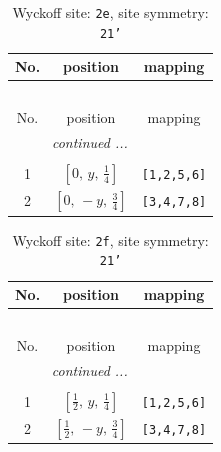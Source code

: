 \documentclass[fleqn,8pt]{jsarticle}
\begin{document}
\begin{longtable}{ccc}
\caption{Wyckoff site: {\tt 2e}, site symmetry: {\tt 21'}}
 \\
 \hline \hline
No. & position & mapping \\ \hline \endfirsthead

\multicolumn{2}{l}{\tablename\ \thetable{}} \\
 \hline \hline
No. & position & mapping \\ \hline \endhead

 \hline \hline
\multicolumn{2}{r}{\footnotesize\it continued ...} \\ \endfoot

 \hline \hline
\multicolumn{2}{r}{} \\ \endlastfoot

1 & $\left[ 0,\, y,\, \frac{1}{4} \right]$ & {\tt [1,2,5,6]} \\ \hline
2 & $\left[ 0,\, - y,\, \frac{3}{4} \right]$ & {\tt [3,4,7,8]} \\
\end{longtable}
\renewcommand{\arraystretch}{1.2}
\begin{longtable}{ccc}
\caption{Wyckoff site: {\tt 2f}, site symmetry: {\tt 21'}}
 \\
 \hline \hline
No. & position & mapping \\ \hline \endfirsthead

\multicolumn{2}{l}{\tablename\ \thetable{}} \\
 \hline \hline
No. & position & mapping \\ \hline \endhead

 \hline \hline
\multicolumn{2}{r}{\footnotesize\it continued ...} \\ \endfoot

 \hline \hline
\multicolumn{2}{r}{} \\ \endlastfoot

1 & $\left[ \frac{1}{2},\, y,\, \frac{1}{4} \right]$ & {\tt [1,2,5,6]} \\ \hline
2 & $\left[ \frac{1}{2},\, - y,\, \frac{3}{4} \right]$ & {\tt [3,4,7,8]} \\
\end{longtable}
\renewcommand{\arraystretch}{1.2}
\end{document}
